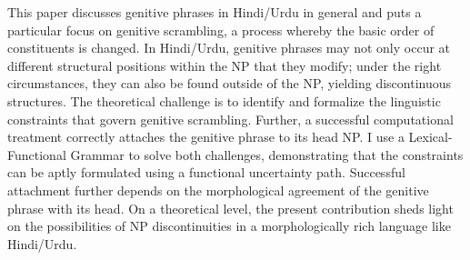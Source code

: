 This paper discusses genitive phrases in Hindi/Urdu in general and puts a particular focus on genitive scrambling, a process whereby the basic order of constituents is changed. In Hindi/Urdu, genitive phrases may not only occur at different structural positions within the NP that they modify; under the right circumstances, they can also be found outside of the NP, yielding discontinuous structures. The theoretical challenge is to identify and formalize the linguistic constraints that govern genitive scrambling. Further, a successful computational treatment correctly attaches the genitive phrase to its head NP. I use a Lexical-Functional Grammar to solve both challenges, demonstrating that the constraints can be aptly formulated using a functional uncertainty path. Successful attachment further depends on the morphological agreement of the genitive phrase with its head. On a theoretical level, the present contribution sheds light on the possibilities of NP discontinuities in a morphologically rich language like Hindi/Urdu.
